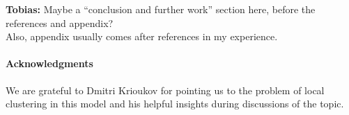 \documentclass[a4paper,10pt]{article}
\newcommand{\1}{\mathds{1}}								%
\newcommand{\BL}[1]{{{\color{blue} #1}}}
\newcommand{\TM}[1]{\BL{{\bf Tobias:} #1}}
\begin{document}
\newpage

\tableofcontents

\newpage



















\TM{ Maybe a ``conclusion and further work'' section here,  before the references and appendix? \\
Also, appendix usually comes after references in my experience.}

\paragraph{Acknowledgments} We are grateful to Dmitri Krioukov for pointing us to the problem of local clustering in this model and his helpful insights during discussions of the topic.






\end{document}

